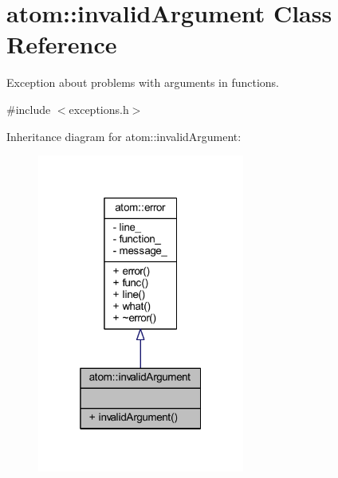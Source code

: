 \hypertarget{classatom_1_1invalid_argument}{}\section{atom\+:\+:invalid\+Argument Class Reference}
\label{classatom_1_1invalid_argument}


Exception about problems with arguments in functions.  




{\ttfamily \#include $<$exceptions.\+h$>$}



Inheritance diagram for atom\+:\+:invalid\+Argument\+:
\nopagebreak
\begin{figure}[H]
\begin{center}
\leavevmode
\includegraphics[width=193pt]{classatom_1_1invalid_argument__inherit__graph}
\end{center}
\end{figure}


